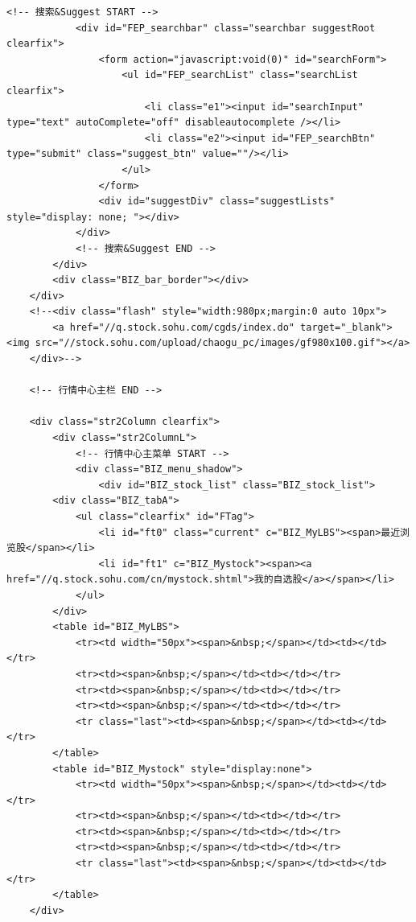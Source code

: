 \documentclass[UTF8,12pt]{article}
\begin{document}
\begin{lstlisting}[title=股票代码300117的界面html源码,frame=shadowbox]
            <!-- 搜索&Suggest START -->
            <div id="FEP_searchbar" class="searchbar suggestRoot clearfix">
                <form action="javascript:void(0)" id="searchForm">
                    <ul id="FEP_searchList" class="searchList clearfix">
                        <li class="e1"><input id="searchInput" type="text" autoComplete="off" disableautocomplete /></li>
                        <li class="e2"><input id="FEP_searchBtn" type="submit" class="suggest_btn" value=""/></li>
                    </ul>
                </form>
                <div id="suggestDiv" class="suggestLists" style="display: none; "></div>
            </div>
            <!-- 搜索&Suggest END -->
        </div>
        <div class="BIZ_bar_border"></div>
    </div>
    <!--<div class="flash" style="width:980px;margin:0 auto 10px">
        <a href="//q.stock.sohu.com/cgds/index.do" target="_blank"><img src="//stock.sohu.com/upload/chaogu_pc/images/gf980x100.gif"></a>
    </div>-->
    
    <!-- 行情中心主栏 END -->
    
    <div class="str2Column clearfix">
        <div class="str2ColumnL">
            <!-- 行情中心主菜单 START -->
            <div class="BIZ_menu_shadow">
                <div id="BIZ_stock_list" class="BIZ_stock_list">
        <div class="BIZ_tabA">
            <ul class="clearfix" id="FTag">
                <li id="ft0" class="current" c="BIZ_MyLBS"><span>最近浏览股</span></li>
                <li id="ft1" c="BIZ_Mystock"><span><a href="//q.stock.sohu.com/cn/mystock.shtml">我的自选股</a></span></li>
            </ul>
        </div>
        <table id="BIZ_MyLBS">
            <tr><td width="50px"><span>&nbsp;</span></td><td></td></tr>
            <tr><td><span>&nbsp;</span></td><td></td></tr>
            <tr><td><span>&nbsp;</span></td><td></td></tr>
            <tr><td><span>&nbsp;</span></td><td></td></tr>
            <tr class="last"><td><span>&nbsp;</span></td><td></td></tr>
        </table>
        <table id="BIZ_Mystock" style="display:none">
            <tr><td width="50px"><span>&nbsp;</span></td><td></td></tr>
            <tr><td><span>&nbsp;</span></td><td></td></tr>
            <tr><td><span>&nbsp;</span></td><td></td></tr>
            <tr><td><span>&nbsp;</span></td><td></td></tr>
            <tr class="last"><td><span>&nbsp;</span></td><td></td></tr>
        </table>
    </div>
    

\end{lstlisting}
\end{document}
